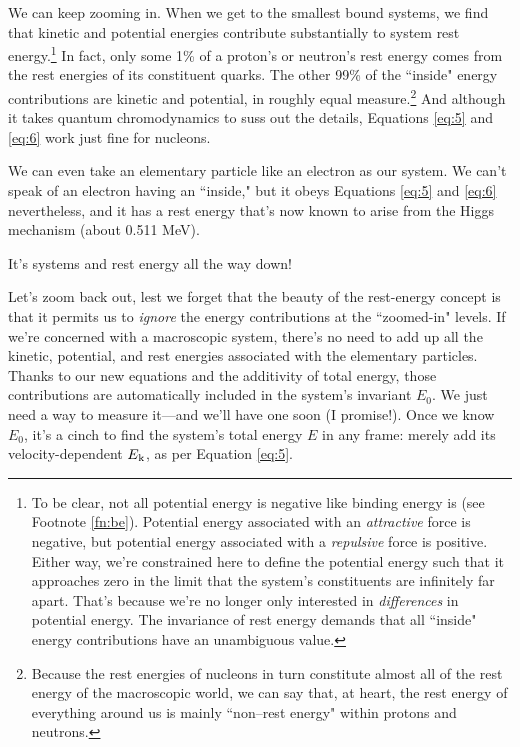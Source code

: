 \documentclass[12pt]{article}
\begin{document}
We can keep zooming in. When we get to the smallest bound systems, we find that kinetic and potential energies contribute substantially to system rest energy.\footnote{To be clear, not all potential energy is negative like binding energy is (see Footnote \ref{fn:be}). Potential energy associated with an \emph{attractive} force is negative, but potential energy associated with a \emph{repulsive} force is positive. Either way, we're constrained here to define the potential energy such that it approaches zero in the limit that the system's constituents are infinitely far apart. That's because we're no longer only interested in \emph{differences} in potential energy. The invariance of rest energy demands that all ``inside" energy contributions have an unambiguous value.} In fact, only some 1\% of a proton's or neutron's rest energy comes from the rest energies of its constituent quarks. The other 99\% of the ``inside" energy contributions are kinetic and potential, in roughly equal measure.\footnote{\label{fn:mwm}Because the rest energies of nucleons in turn constitute almost all of the rest energy of the macroscopic world, we can say that, at heart, the rest energy of everything around us is mainly ``non--rest energy" within protons and neutrons.} And although it takes quantum chromodynamics to suss out the details, Equations \ref{eq:5} and \ref{eq:6} work just fine for nucleons.

We can even take an elementary particle like an electron as our system. We can't speak of an electron having an ``inside," but it obeys Equations \ref{eq:5} and \ref{eq:6} nevertheless, and it has a rest energy that's now known to arise from the Higgs mechanism (about 0.511 MeV).

It's systems and rest energy all the way down!

Let's zoom back out, lest we forget that the beauty of the rest-energy concept is that it permits us to \emph{ignore} the energy contributions at the ``zoomed-in" levels. If we're concerned with a macroscopic system, there's no need to add up all the kinetic, potential, and rest energies associated with the elementary particles. Thanks to our new equations and the additivity of total energy, those contributions are automatically included in the system's invariant $E_0$. We just need a way to measure it---and we'll have one soon (I promise!). Once we know $E_0$, it's a cinch to find the system's total energy $E$ in any frame: merely add its velocity-dependent $E_{\mkern.5mu \textrm{k}}$, as per Equation \ref{eq:5}.
\end{document}
